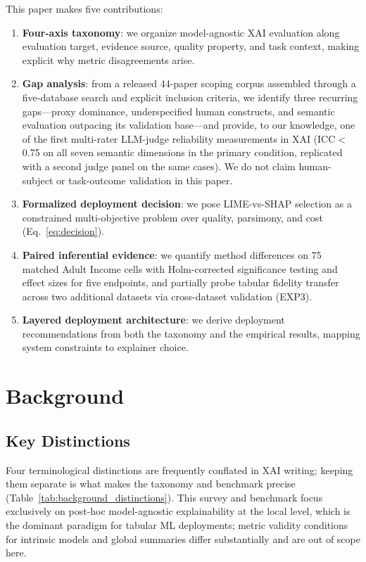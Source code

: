 \documentclass[10pt,a4paper,twoside]{article}
\begin{document}
This paper makes five contributions:
\begin{enumerate}[leftmargin=*]
\item \textbf{Four-axis taxonomy}: we organize model-agnostic XAI
evaluation along evaluation target, evidence source, quality property,
and task context, making explicit why metric disagreements arise.
\item \textbf{Gap analysis}: from a released 44-paper scoping corpus
assembled through a five-database search and explicit inclusion criteria,
we identify three recurring gaps---proxy dominance, underspecified human constructs, and semantic
evaluation outpacing its validation base---and provide, to our
knowledge, one of the first multi-rater LLM-judge reliability measurements in
XAI (ICC$<$0.75 on all seven semantic dimensions in the primary condition,
replicated with a second judge panel on the same cases). We do not claim
human-subject or task-outcome validation in this paper.
\item \textbf{Formalized deployment decision}: we pose LIME-vs-SHAP
selection as a constrained multi-objective problem over quality, parsimony,
and cost (Eq.~\ref{eq:decision}).
\item \textbf{Paired inferential evidence}: we quantify method differences
on 75 matched Adult Income cells with Holm-corrected significance testing
and effect sizes for five endpoints, and partially probe tabular fidelity
transfer across two additional datasets via cross-dataset validation
(EXP3).
\item \textbf{Layered deployment architecture}: we derive deployment
recommendations from both the taxonomy and the empirical results, mapping
system constraints to explainer choice.
\end{enumerate}


\section{Background}
\label{sec:background}

\subsection{Key Distinctions}

Four terminological distinctions are frequently conflated in XAI writing;
keeping them separate is what makes the taxonomy and benchmark precise
(Table~\ref{tab:background_distinctions}). This survey and benchmark focus
exclusively on post-hoc model-agnostic explainability at the local level,
which is the dominant paradigm for tabular ML deployments; metric validity
conditions for intrinsic models and global summaries differ substantially
and are out of scope here.
\end{document}
